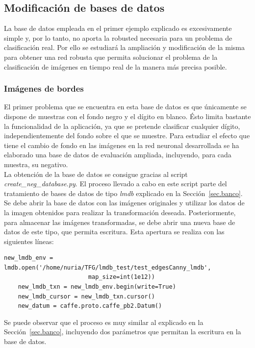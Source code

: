 \subsection{Modificación de bases de datos} \label{sec.mod_bbdd}

La base de datos empleada en el primer ejemplo explicado es excesivamente simple y, por lo tanto, no aporta la robusted necesaria para un problema de clasificación real. Por ello se estudiará la ampliación y modificación de la misma para obtener una red robusta que permita solucionar el problema de la clasificación de imágenes en tiempo real de la manera más precisa posible.
\subsubsection{Imágenes de bordes} \label{sec.bordes}
El primer problema que se encuentra en esta base de datos es que únicamente se dispone de muestras con el fondo negro y el dígito en blanco. Ésto limita bastante la funcionalidad de la aplicación, ya que se pretende clasificar cualquier dígito, independientemente del fondo sobre el que se muestre. Para estudiar el efecto que tiene el cambio de fondo en las imágenes en la red neuronal desarrollada se ha elaborado una base de datos de evaluación ampliada, incluyendo, para cada muestra, su negativo.\\

La obtención de la base de datos se consigue gracias al script \textit{create\_neg\_database.py}. El proceso llevado a cabo en este script parte del tratamiento de bases de datos de tipo \textit{lmdb} explicado en la Sección~\ref{sec.banco}. Se debe abrir la base de datos con las imágenes originales y utilizar los datos de la imagen obtenidos para realizar la transformación deseada. Posteriormente, para almacenar las imágenes transformadas, se debe abrir una nueva base de datos de este tipo, que permita escritura. Esta apertura se realiza con las siguientes líneas:
\vspace{35pt}
\begin{lstlisting}[frame=single]
	new_lmdb_env = lmdb.open('/home/nuria/TFG/lmdb_test/test_edgesCanny_lmdb',
						map_size=int(1e12))
	new_lmdb_txn = new_lmdb_env.begin(write=True)
	new_lmdb_cursor = new_lmdb_txn.cursor()
	new_datum = caffe.proto.caffe_pb2.Datum()
\end{lstlisting}
Se puede observar que el proceso es muy similar al explicado en la Sección~\ref{sec.banco}, incluyendo dos parámetros que permitan la escritura en la base de datos.\\

